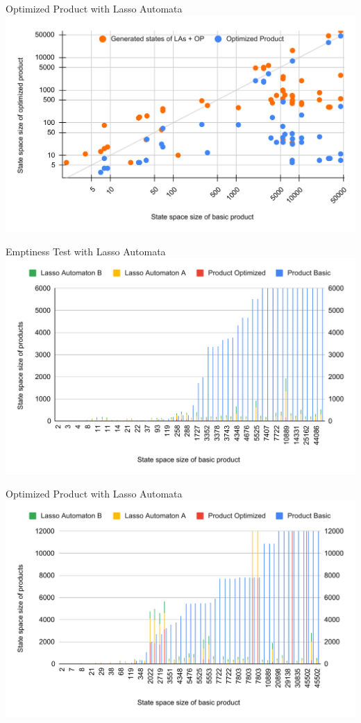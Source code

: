 \begin{frame}{Optimized Product with Lasso Automata}
    \center\includegraphics[scale=0.5]{img/graph_scatter_combined_fp_titles.pdf}
\end{frame}

\begin{frame}{Emptiness Test with Lasso Automata}
    \center\includegraphics[scale=0.5]{img/graph_stacked_et_titles.pdf}
\end{frame}

\begin{frame}{Optimized Product with Lasso Automata}
    \center\includegraphics[scale=0.5]{img/graph_stacked_fp_titles.pdf}
\end{frame}

